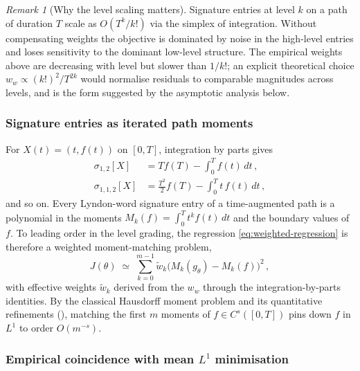 \documentclass[12pt,english]{article}
\theoremstyle{remark}
\newtheorem{remark}[theorem]{Remark}
\begin{document}
\begin{remark}[Why the level scaling matters]
Signature entries at level $k$ on a path of duration $T$ scale as
$O(T^{k}/k!)$ via the simplex of integration. Without compensating
weights the objective is dominated by noise in the high-level entries
and loses sensitivity to the dominant low-level structure. The empirical
weights above are decreasing with level but slower than $1/k!$; an
explicit theoretical choice $w_{w}\propto(k!)^{2}/T^{2k}$ would normalise
residuals to comparable magnitudes across levels, and is the form
suggested by the asymptotic analysis below.
\end{remark}

\subsubsection{Signature entries as iterated path moments}

For $X(t)=(t,f(t))$ on $[0,T]$, integration by parts gives
\begin{align}
\sigma_{1,2}[X] & =Tf(T)-\textstyle\int_{0}^{T}f(t)\,dt\,,\label{eq:moment-12}\\
\sigma_{1,1,2}[X] & =\textstyle\frac{T^{2}}{2}f(T)-\int_{0}^{T}t\,f(t)\,dt\,,
\end{align}
and so on. Every Lyndon-word signature entry of a time-augmented path
is a polynomial in the moments $M_{k}(f)=\int_{0}^{T}t^{k}f(t)\,dt$
and the boundary values of $f$. To leading order in the level grading,
the regression \eqref{eq:weighted-regression} is therefore a weighted
moment-matching problem,
\begin{equation}
J(\theta)\;\simeq\;\sum_{k=0}^{m-1}\widetilde{w}_{k}\bigl(M_{k}(g_{\theta})-M_{k}(f)\bigr)^{2}\,,\label{eq:moment-regression}
\end{equation}
with effective weights $\widetilde{w}_{k}$ derived from the $w_{w}$
through the integration-by-parts identities. By the classical Hausdorff
moment problem and its quantitative refinements (\cite{Talenti}),
matching the first $m$ moments of $f\in C^{s}([0,T])$ pins down
$f$ in $L^{1}$ to order $O(m^{-s})$.

\subsubsection{Empirical coincidence with mean $L^{1}$ minimisation\label{subsubsec:L1-coincidence}}
\end{document}
